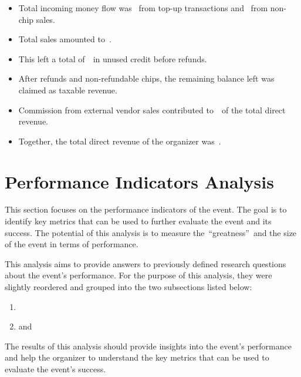 \begin{keytakeaways}
	\begin{itemize}
		\item Total incoming money flow was~ from top-up transactions and~ from non-chip sales.
		\item Total sales amounted to~.
		\item This left a total of~~in unused credit before refunds.
		\item After refunds and non-refundable chips, the remaining balance left was~ claimed as taxable revenue.
		\item Commission from external vendor sales contributed to~~of the total direct revenue.
		\item Together, the total direct revenue of the organizer was~.
	\end{itemize}
\end{keytakeaways}



\section{Performance Indicators Analysis}
\label{sec:analysis-performance-indicators}

This section focuses on the performance indicators of the event.
The goal is to identify key metrics that can be used to further evaluate the event and its success.
The potential of this analysis is to measure the~\enquote{greatness}~and the size of the event in terms of performance.

This analysis aims to provide answers to previously defined research questions about the event's performance.
For the purpose of this analysis, they were slightly reordered and grouped into the two subsections listed below:
\begin{enumerate}
	\item {}
	\item and~
\end{enumerate}

The results of this analysis should provide insights into the event's performance and help the organizer to understand the key metrics that can be used to evaluate the event's success.

